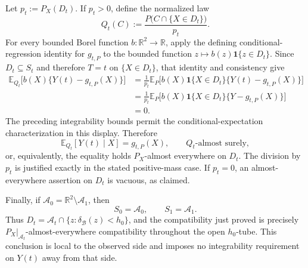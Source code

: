 Let \(p_t:=P_X(D_t)\). If \(p_t>0\), define the normalized law
\[
Q_t(C):=\frac{P\bigl(C\cap\{X\in D_t\}\bigr)}{p_t}.
\]
For every bounded Borel function \(b:\mathbb R^2\to\mathbb R\), apply the defining conditional-regression identity for \(g_{t,P}\) to the bounded function \(z\mapsto b(z)\mathbf 1\{z\in D_t\}\). Since \(D_t\subseteq S_t\) and therefore \(T=t\) on \(\{X\in D_t\}\), that identity and consistency give
\[
\begin{aligned}
\mathbb E_{Q_t}\bigl[b(X)\{Y(t)-g_{t,P}(X)\}\bigr]
&=\frac{1}{p_t}\mathbb E_P\bigl[b(X)\mathbf 1\{X\in D_t\}\{Y(t)-g_{t,P}(X)\}\bigr]\\
&=\frac{1}{p_t}\mathbb E_P\bigl[b(X)\mathbf 1\{X\in D_t\}\{Y-g_{t,P}(X)\}\bigr]\\
&=0.
\end{aligned}
\]
The preceding integrability bounds permit the conditional-expectation characterization in this display. Therefore
\[
\mathbb E_{Q_t}[Y(t)\mid X]=g_{t,P}(X),\qquad Q_t\text{-almost surely},
\]
or, equivalently, the equality holds \(P_X\)-almost everywhere on \(D_t\). The division by \(p_t\) is justified exactly in the stated positive-mass case. If \(p_t=0\), an almost-everywhere assertion on \(D_t\) is vacuous, as claimed.

Finally, if \(\mathcal A_0=\mathbb R^2\setminus\mathcal A_1\), then
\[
S_0=\mathcal A_0,\qquad S_1=\mathcal A_1.
\]
Thus \(D_t=\mathcal A_t\cap\{z:\delta_{\mathcal B}(z)<h_0\}\), and the compatibility just proved is precisely \(P_X|_{\mathcal A_t}\)-almost-everywhere compatibility throughout the open \(h_0\)-tube. This conclusion is local to the observed side and imposes no integrability requirement on \(Y(t)\) away from that side.